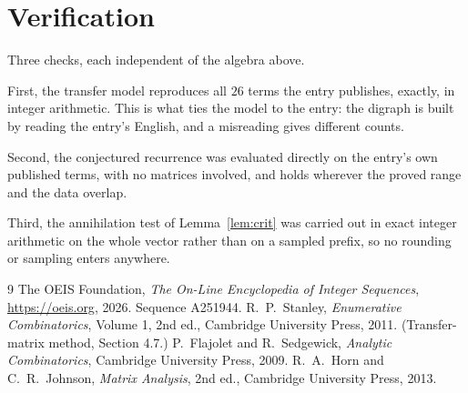 \documentclass[11pt,a4paper]{article}
\theoremstyle{plain}
\theoremstyle{definition}
\begin{document}
\section{Verification}

Three checks, each independent of the algebra above.

First, the transfer model reproduces all $26$ terms the entry publishes, exactly, in
integer arithmetic. This is what ties the model to the entry: the digraph is built by reading
the entry's English, and a misreading gives different counts.

Second, the conjectured recurrence was evaluated directly on the entry's own published terms,
with no matrices involved, and holds wherever the proved range and the data overlap.

Third, the annihilation test of Lemma~\ref{lem:crit} was carried out in exact integer
arithmetic on the whole vector rather than on a sampled prefix, so no rounding or sampling
enters anywhere.

\begin{thebibliography}{9}
 The OEIS Foundation, \emph{The On-Line Encyclopedia of Integer
Sequences}, \url{https://oeis.org}, 2026. Sequence A251944.
 R.~P.~Stanley, \emph{Enumerative Combinatorics}, Volume 1, 2nd ed.,
Cambridge University Press, 2011. (Transfer-matrix method, Section 4.7.)
 P.~Flajolet and R.~Sedgewick, \emph{Analytic Combinatorics}, Cambridge
University Press, 2009.
 R.~A.~Horn and C.~R.~Johnson, \emph{Matrix Analysis}, 2nd ed., Cambridge
University Press, 2013.
\end{thebibliography}
\end{document}
